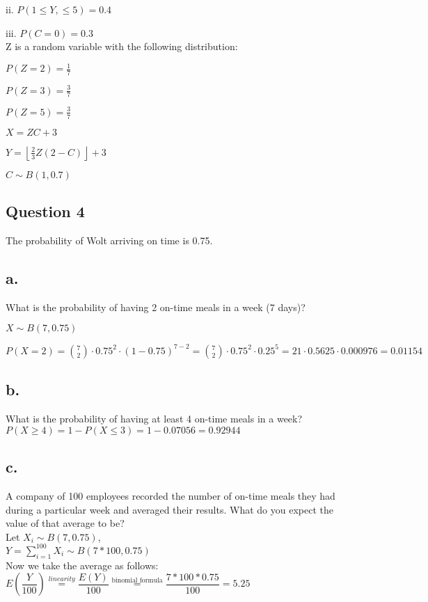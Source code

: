 \documentclass[12pt]{article}
\newcommand\tab[1][1cm]{\hspace*{#1}}
\begin{document}
    \tab ii.  $ P(1 \leq Y, \leq 5) = 0.4$

    \tab iii.  $ P(C=0) = 0.3$\\

    Z is a random variable with the following distribution:

    $ P(Z = 2) = \frac{1}{7} $

    $ P(Z = 3) = \frac{3}{7} $

    $ P(Z = 5) = \frac{3}{7} $


    $ X = ZC + 3 $

    $ Y = \left \lfloor{\frac{2}{3}Z(2-C)}\right \rfloor + 3 $

    $ C \sim B(1, 0.7) $

    \newpage

    \begin{center}
        \section*{Question 4}
    \end{center}

    The probability of Wolt arriving on time is 0.75.

    \subsection*{a.}

    What is the probability of having 2 on-time meals in a week (7 days)?

    $ X \sim B(7, 0.75) $

    $ P(X=2) = \binom{7}{2} \cdot 0.75^2 \cdot(1-0.75)^{7-2} = \binom{7}{2} \cdot 0.75^2 \cdot 0.25^5 = 21 \cdot 0.5625 \cdot 0.000976 = 0.01154 $

    \subsection*{b.}

    What is the probability of having at least 4 on-time meals in a week? \\

    $ P(X \geq 4) =  1 - P(X \leq 3) = 1 - 0.07056 = 0.92944$

    \subsection*{c.}

    \tab A company of 100 employees recorded the number of on-time meals they had during a particular week and averaged their results. What do you expect the value of that average to be? \\

    Let $X_i \sim B(7, 0.75) $, \\

    $Y = \sum_{i=1}^{100} X_i \sim B(7* 100, 0.75) $\\

    Now we take the average as follows: \\

    $E(\dfrac{Y}{100}) \stackrel{linearity}{=} \dfrac{E(Y)}{100} \stackrel{\text{binomial formula}}{=} \dfrac{7*100*0.75}{100}  = 5.25 $
\end{document}

